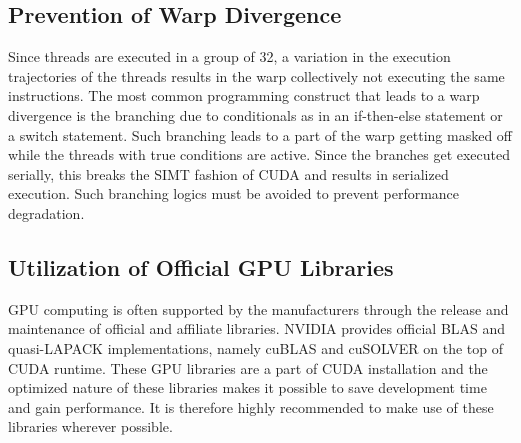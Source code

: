 \documentclass[thesis.tex]{subfiles}
\begin{document}
\subsection{Prevention of Warp Divergence}
Since threads are executed in a group of 32, a variation in the execution trajectories of the threads results in the warp collectively not executing the same instructions. The most common programming construct that leads to a warp divergence is the branching due to conditionals as in an if-then-else statement or a switch statement. Such branching leads to a part of the warp getting masked off while the threads with true conditions are active. Since the branches get executed serially, this breaks the SIMT fashion of CUDA and results in serialized execution. Such branching logics must be avoided to prevent performance degradation.

\subsection{Utilization of Official GPU Libraries}
GPU computing is often supported by the manufacturers through the release and maintenance of official and affiliate libraries. NVIDIA provides official BLAS and quasi-LAPACK implementations, namely cuBLAS and cuSOLVER on the top of CUDA runtime. These GPU libraries are a part of CUDA installation and the optimized nature of these libraries makes it possible to save development time and gain performance. It is therefore highly recommended to make use of these libraries wherever possible.
\end{document}
